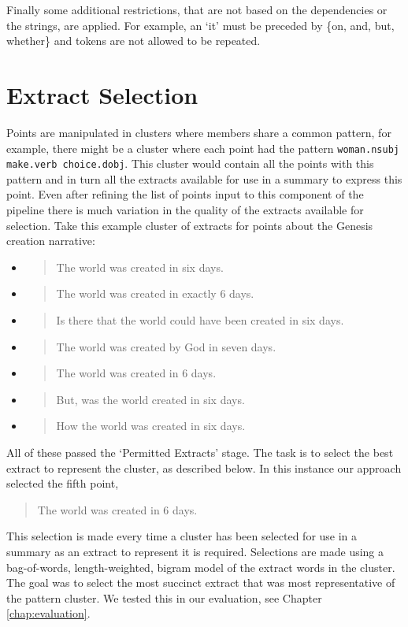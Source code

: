     Finally some additional restrictions, that are not based on the dependencies or the strings, are applied. For example, an `it' must be preceded by \{on, and, but, whether\} and tokens are not allowed to be repeated.

  \section{Extract Selection}
    Points are manipulated in clusters where members share a common pattern, for example, there might be a cluster where each point had the pattern \texttt{woman.nsubj make.verb choice.dobj}. This cluster would contain all the points with this pattern and in turn all the extracts available for use in a summary to express this point. Even after refining the list of points input to this component of the pipeline there is much variation in the quality of the extracts available for selection. Take this example cluster of extracts for points about the Genesis creation narrative:

    \begin{itemize}[label={}]
      \item{\blockquote{The world was created in six days.}}
      \item{\blockquote{The world was created in exactly 6 days.}}
      \item{\blockquote{Is there that the world could have been created in six days.}}
      \item{\blockquote{The world was created by God in seven days.}}
      \item{\blockquote{The world was created in 6 days.}}
      \item{\blockquote{But, was the world created in six days.}}
      \item{\blockquote{How the world was created in six days.}}
    \end{itemize}

    All of these passed the `Permitted Extracts' stage. The task is to select the best extract to represent the cluster, as described below. In this instance our approach selected the fifth point, \blockquote{The world was created in 6 days.}. This selection is made every time a cluster has been selected for use in a summary as an extract to represent it is required. Selections are made using a bag-of-words, length-weighted, bigram model of the extract words in the cluster. The goal was to select the most succinct extract that was most representative of the pattern cluster. We tested this in our evaluation, see Chapter \ref{chap:evaluation}.


